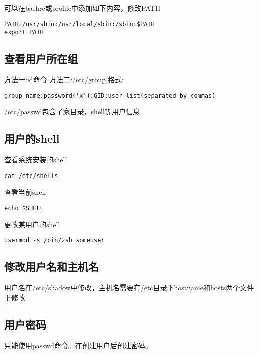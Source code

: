 可以在bashrc或profile中添加如下内容，修改PATH
\begin{verbatim}
PATH=/usr/sbin:/usr/local/sbin:/sbin:$PATH
export PATH
\end{verbatim}

\subsection{查看用户所在组}
方法一:id命令
方法二:/etc/group,格式:
\begin{verbatim}
group_name:password('x'):GID:user_list(separated by commas)
\end{verbatim}

/etc/passwd包含了家目录，shell等用户信息

\subsection{用户的shell}
查看系统安装的shell
\begin{verbatim}
cat /etc/shells
\end{verbatim}

查看当前shell
\begin{verbatim}
echo $SHELL
\end{verbatim}

更改某用户的shell
\begin{verbatim}
usermod -s /bin/zsh someuser
\end{verbatim}


\subsection{修改用户名和主机名}
用户名在/etc/shadow中修改，主机名需要在/etc目录下hostname和hosts两个文件下修改

\subsection{用户密码}
只能使用passwd命令。在创建用户后创建密码。
